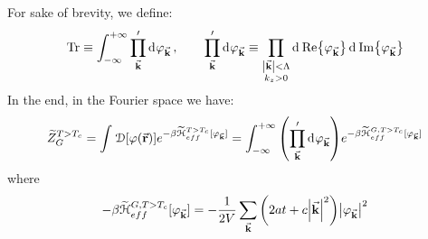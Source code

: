 \documentclass[../main/main.tex]{subfiles}
\begin{document}
For sake of brevity, we define:
\begin{equation}
  \Tr \equiv \int_{-\infty }^{+\infty } \prod_{\va{k}}'  \dd[]{\varphi _{\va{k}}}, \qquad
   \prod_{\va{k}}' \dd[]{\varphi _{\va{k}}} \equiv \prod_{\substack{ \abs{\va{k}} < \Lambda   \\ k_z >0 } }^{}   \dd[]{\Re {\varphi _{\va{k}}}}  \dd[]{\Im {\varphi _{\va{k}}}}
\end{equation}
In the end,  in the Fourier space we have:
\begin{equation}
  \widetilde{Z} _{G}^{T>T_c} =   \int_{}^{} \mathcal{D} \qty[\varphi (\va{r})]
  e^{- \beta \widetilde{\mathcal{H}}_{eff}^{T>T_c} [\varphi _{\va{k}}] } =
   \int_{- \infty }^{+ \infty }  \qty( \prod_{\va{k}}'  \dd[]{\varphi _{\va{k}}})
  e^{- \beta \widetilde{\mathcal{H}}_{eff}^{G,T>T_c} [\varphi _{\va{k}}] }
  \label{eq:18_9}
\end{equation}
where
\begin{equation}
  - \beta \widetilde{\mathcal{H}}_{eff}^{G,T>T_c} [\varphi _{\va{k}}] = - \frac{1}{2V} \sum_{\va{k}}^{} \qty(2at+c \abs{\va{k}}^2 ) \abs{\varphi _{\va{k}}}^2
\end{equation}
\end{document}
